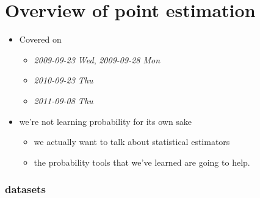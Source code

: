
\part{Overview of point estimation}

\begin{itemize}
\item Covered on
\begin{itemize}
\item \textit{2009-09-23 Wed}, \textit{2009-09-28 Mon}
\item \textit{2010-09-23 Thu}
\item \textit{2011-09-08 Thu}
\end{itemize}
\item we're not learning probability for its own sake
\begin{itemize}
\item we actually want to talk about statistical estimators
\item the probability tools that we've learned are going to help.
\end{itemize}
\end{itemize}
\section{datasets}
\label{sec-1}

